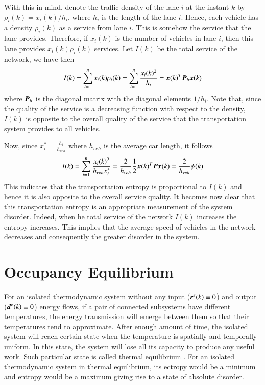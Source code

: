 \documentclass[preprint,authoryear,12pt]{elsarticle}
\renewcommand{\vec}[1]{\mbox{\boldmath$#1$}}
\newcommand{\mat}[1]{\mbox{\boldmath$#1$}}
\begin{document}
With this in mind, denote the traffic density of the lane $i$ at the
instant $k$ by $\rho_i(k)=x_i(k)/h_i$, where $h_i$ is the length of
the lane $i$. Hence, each vehicle has a density $\rho_i(k)$ as a
service from lane $i$. This is somehow the service that the lane 
provides. Therefore, if $x_i(k)$ is the number of vehicles in lane
$i$, then this lane provides $x_i(k)\rho_i(k)$ services.
Let $I(k)$ be the total service of the network, we have then
\begin{equation}
\label{equ:quality_service}
I(k)=\sum_{i=1}^{n} x_i(k)\rho_i(k)
=\sum_{i=1}^{n}\frac{x_i(k)^2}{h_i}
=\vec{x}(k)^T\mat{P}_h\vec{x}(k)
\end{equation}
where $\mat{P}_h$ is the diagonal matrix with the diagonal elements
$1/h_i$. Note that, since the quality of the service is a decreasing 
function with respect to the density, $I(k)$ is opposite to the
overall quality of the service that the transportation system provides
to all vehicles.

Now, since $x_i^*=\frac{h_i}{h_{veh}}$ where $h_{veh}$ is the average
car length, it follows
\begin{equation}
I(k) = \sum_{i=1}^{n}\frac{x_i(k)^2}{h_{veh} x_i^*}
= \frac{2}{h_{veh}} \frac{1}{2}\vec{x}(k)^T\mat{P}\vec{x}(k)
= \frac{2}{h_{veh}} \psi(k)
\end{equation}
This indicates that the transportation entropy is proportional to
$I(k)$ and hence it is also opposite to the overall service quality. It
becomes now clear that this transportation entropy is an appropriate
measurement of the system disorder. Indeed, when he total service of
the network  $I(k)$ increases the entropy increases. This
implies that the average speed of vehicles in the network decreases and consequently the
greater disorder in the system.

\section{Occupancy Equilibrium}\label{sec:equilibrium}

For an isolated thermodynamic system without any input
($\vec{r}^e(k)\equiv 0$) and output ($\vec{d}^e(k)\equiv 0$) energy
flows, if a pair of connected subsystems have different temperatures,
the energy transmission will emerge between them so that their
temperatures tend to approximate. After enough amount of time, the
isolated system will reach certain state when the temperature is
spatially and temporally uniform. In this state, the system will lose
all its capacity to produce any useful work. Such particular state is
called thermal equilibrium \citep{cengel_thermodynamics:_2001}. For
an isolated thermodynamic system in thermal equilibrium, its ectropy
would be a minimum and entropy would be a maximum giving rise to a
state of absolute disorder.
\end{document}
